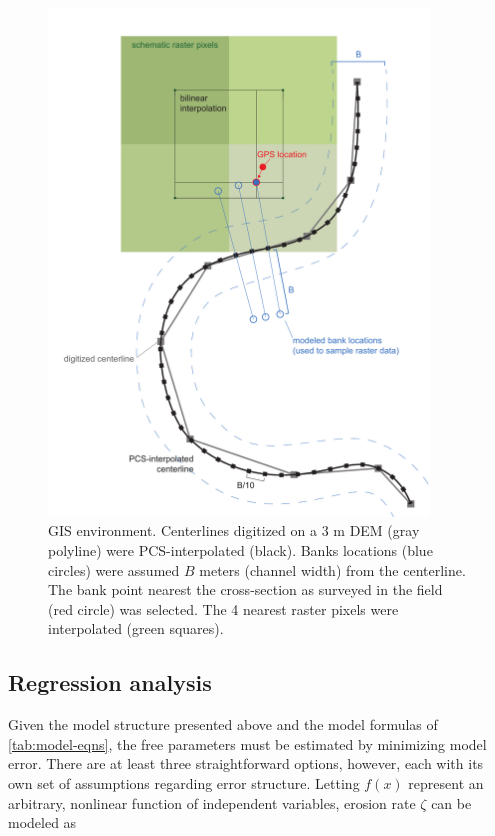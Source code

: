 \documentclass[preprint, review, authoryear, 12pt]{elsarticle}
\begin{document}
\begin{figure}
\centering
\includegraphics[width=0.9\textwidth]{figs/model-setup.pdf}
\caption{GIS environment. Centerlines digitized on a 3 m DEM (gray polyline) were PCS-interpolated (black). Banks locations (blue circles) were assumed $B$ meters (channel width) from the centerline. The bank point nearest the cross-section as surveyed in the field (red circle) was selected. The 4 nearest raster pixels were interpolated (green squares).}\label{fig:setup}
\end{figure}

\subsection{Regression analysis}\label{sec:regression}
Given the model structure presented above and the model formulas of \cref{tab:model-eqns}, the free parameters must be estimated by minimizing model error. There are at least three straightforward options, however, each with its own set of assumptions regarding error structure. Letting $f(x)$ represent an arbitrary, nonlinear function of independent variables, erosion rate $\zeta$ can be modeled as
\end{document}
